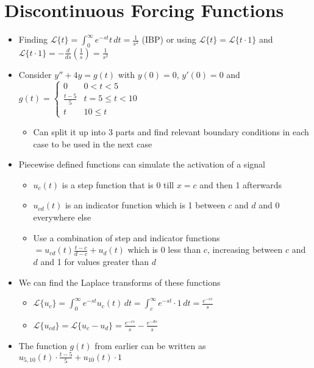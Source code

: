 \documentclass[12pt]{article}
\begin{document}
\section{Discontinuous Forcing Functions}

\begin{itemize}
    \item Finding $\mathcal{L} \{ t \} = \int_{0}^{\infty} e^{-st} t \, dt = \frac{1}{s^2}$ (IBP) or using $\mathcal{L} \{t\} = \mathcal{L} \{t \cdot 1 \}$ and $\mathcal{L} \{ t \cdot 1 \} = - \frac{d}{ds} (\frac{1}{s}) = \frac{1}{s^2}$
    \item Consider $y'' + 4y = g(t)$ with $y(0) = 0$, $y'(0) = 0$ and $g(t) = \begin{cases} 
        0 & 0 < t < 5 \\
        \frac{t-5}{5} & t = 5 \leq t < 10 \\
        t & 10 \leq t
     \end{cases}$ \begin{itemize}
         \item Can split it up into 3 parts and find relevant boundary conditions in each case to be used in the next case 
     \end{itemize}
     \item Piecewise defined functions can simulate the activation of a signal \begin{itemize}
         \item $u_c(t)$ is a step function that is 0 till $x = c$ and then 1 afterwards
         \item $u_{cd} (t)$ is an indicator function which is 1 between $c$ and $d$ and 0 everywhere else
         \item Use a combination of step and indicator functions $= u_{cd} (t) \frac{t-c}{d-c} + u_d(t)$ which is 0 less than $c$, increasing between $c$ and $d$ and 1 for values greater than $d$
     \end{itemize}
     \item We can find the Laplace transforms of these functions \begin{itemize}
         \item $\mathcal{L} \{ u_c \} = \int_{0}^{\infty} e^{-st} u_c(t) \, dt = \int_{c}^{\infty} e^{-st} \cdot 1 \, dt = \frac{e^{-cs}}{s}$
         \item $\mathcal{L} \{ u_{cd} \} = \mathcal{L} \{ u_c - u_d \} = \frac{e^{-cs}}{s} - \frac{e^{-ds}}{s}$
     \end{itemize}
     \item The function $g(t)$ from earlier can be written as $u_{5,10} (t) \cdot \frac{t-5}{5} + u_{10} (t) \cdot 1 $ \begin{itemize}

\end{itemize}
\end{itemize}
\end{document}
